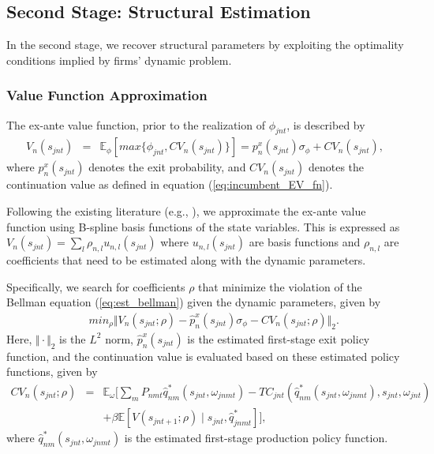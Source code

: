 \documentclass[12pt]{article}
\begin{document}
\subsection{Second Stage: Structural Estimation}
\label{subsec:est_dynamic_second}
In the second stage, we recover structural parameters by exploiting the optimality conditions implied by firms’ dynamic problem.

\subsubsection{Value Function Approximation}
The ex-ante value function, prior to the realization of $\phi_{jnt}$, is described by
\begin{eqnarray}
    V_n(s_{jnt}) & = & \mathbb{E}_\phi[ max\{\phi_{jnt},CV_n(s_{jnt})\}] = p_n^x(s_{jnt}) \sigma_\phi + CV_n(s_{jnt}), \label{eq:est_bellman}
\end{eqnarray}
where $p_n^x(s_{jnt})$ denotes the exit probability, and $CV_n(s_{jnt})$ denotes the continuation value as defined in equation (\ref{eq:incumbent_EV_fn}).

Following the existing literature (e.g., \citet{sweeting2013dynamic}), we approximate the ex-ante value function using B-spline basis functions of the state variables. This is expressed as $V_n(s_{jnt}) = \sum_l \rho_{n,l} u_{n,l}(s_{jnt})$ where $u_{n,l}(s_{jnt})$ are basis functions and $\rho_{n,l}$ are coefficients that need to be estimated along with the dynamic parameters.

Specifically, we search for coefficients $\rho$ that minimize the violation of the Bellman equation (\ref{eq:est_bellman}) given the dynamic parameters, given by
\begin{eqnarray}
     &  & min_{\rho} \Vert V_n(s_{jnt};\rho) -\hat{p}^x_n(s_{jnt}) \sigma_{\phi} - CV_n(s_{jnt};\rho)\Vert_2.\label{eq:est_value_func_approx}
\end{eqnarray}
Here, $\Vert \cdot \Vert_2$ is the $L^2$ norm, $\hat{p}^x_n(s_{jnt})$ is the estimated first-stage exit policy function, and the continuation value is evaluated based on these estimated policy functions, given by
\begin{eqnarray*}
CV_n(s_{jnt};\rho) & = & \mathbb{E}_{\omega} \Big[ \sum_m P_{nmt} \hat{q}^*_{nm}(s_{jnt},\omega_{jnmt}) - TC_{jnt}(\hat{q}^*_{nm}(s_{jnt},\omega_{jnmt}),s_{jnt},\omega_{jnt}) \\
&& + \beta \mathbb{E}[V(s_{jnt+1};\rho)\mid s_{jnt}, \hat{q}^*_{jnmt}] \Big],
\end{eqnarray*}
where $\hat{q}^*_{nm}(s_{jnt},\omega_{jnmt})$ is the estimated first-stage production policy function.
\end{document}
